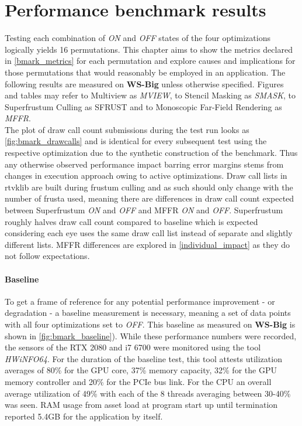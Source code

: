 
\chapter{Performance benchmark results} \label{results}
Testing each combination of \textit{ON} and \textit{OFF} states of the four optimizations logically yields 16 permutations. This chapter aims to show the metrics declared in \autoref{bmark_metrics} for each permutation and explore causes and implications for those permutations that would reasonably be employed in an application. 
The following results are measured on \textbf{WS-Big} unless otherwise specified. Figures and tables may refer to Multiview as \textit{MVIEW}, to Stencil Masking as \textit{SMASK}, to Superfrustum Culling as {SFRUST} and to Monoscopic Far-Field Rendering as \textit{MFFR}. \\

The plot of draw call count submissions during the test run looks as \autoref{fig:bmark_drawcalls} and is identical for every subsequent test using the respective optimization due to the synthetic construction of the benchmark. Thus any otherwise observed performance impact barring error margins stems from changes in execution approach owing to active optimizations. Draw call lists in \gls{rtvklib} are built during frustum culling and as such should only change with the number of frusta used, meaning there are differences in draw call count expected between Superfrustum \textit{ON} and \textit{OFF} and MFFR \textit{ON} and \textit{OFF}. Superfrustum roughly halves draw call count compared to baseline which is expected considering each eye uses the same draw call list instead of separate and slightly different lists. MFFR differences are explored in \autoref{individual_impact} as they do not follow expectations. 

\subsubsection{Baseline}
To get a frame of reference for any potential performance improvement - or degradation - a baseline measurement is necessary, meaning a set of data points with all four optimizations set to \textit{OFF}. This baseline as measured on \textbf{WS-Big} is shown in \autoref{fig:bmark_baseline}). 
While these performance numbers were recorded, the sensors of the RTX 2080 and i7 6700 were monitored using the tool \textit{HWiNFO64}. For the duration of the baseline test, this tool attests utilization averages of 80\% for the GPU core, 37\% memory capacity, 32\% for the GPU memory controller and 20\% for the PCIe bus link. 
For the CPU an overall average utilization of 49\% with each of the 8 threads averaging between 30-40\% was seen. RAM usage from asset load at program start up until termination reported 5.4GB for the application by itself. 

